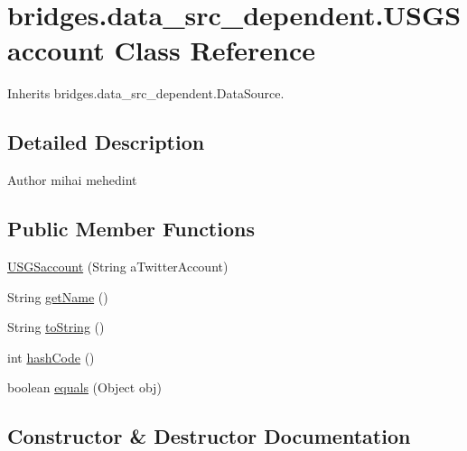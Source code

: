 \hypertarget{classbridges_1_1data__src__dependent_1_1_u_s_g_saccount}{}\section{bridges.\+data\+\_\+src\+\_\+dependent.\+U\+S\+G\+Saccount Class Reference}
\label{classbridges_1_1data__src__dependent_1_1_u_s_g_saccount}


Inherits bridges.\+data\+\_\+src\+\_\+dependent.\+Data\+Source.



\subsection{Detailed Description}
\begin{DoxyAuthor}{Author}
mihai mehedint 
\end{DoxyAuthor}
\subsection*{Public Member Functions}
\begin{DoxyCompactItemize}
\item 
\mbox{\hyperlink{classbridges_1_1data__src__dependent_1_1_u_s_g_saccount_ae50a964b2b0bd02b905371d6f439b8dd}{U\+S\+G\+Saccount}} (String a\+Twitter\+Account)
\item 
String \mbox{\hyperlink{classbridges_1_1data__src__dependent_1_1_u_s_g_saccount_abc30e69535f158a5f7d6f6d8c8da7bec}{get\+Name}} ()
\item 
String \mbox{\hyperlink{classbridges_1_1data__src__dependent_1_1_u_s_g_saccount_a832c5a4953a40fd3fa89243fcdabc435}{to\+String}} ()
\item 
int \mbox{\hyperlink{classbridges_1_1data__src__dependent_1_1_u_s_g_saccount_afe2cc53d7993aaf4424f42fb535c7ed1}{hash\+Code}} ()
\item 
boolean \mbox{\hyperlink{classbridges_1_1data__src__dependent_1_1_u_s_g_saccount_a408a8361407b49199f56ace3421956bf}{equals}} (Object obj)
\end{DoxyCompactItemize}


\subsection{Constructor \& Destructor Documentation}
\mbox{\label{classbridges_1_1data__src__dependent_1_1_u_s_g_saccount_ae50a964b2b0bd02b905371d6f439b8dd}} 
